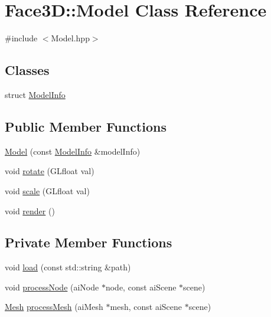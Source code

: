 \hypertarget{class_face3_d_1_1_model}{}\section{Face3D\+:\+:Model Class Reference}
\label{class_face3_d_1_1_model}


{\ttfamily \#include $<$Model.\+hpp$>$}

\subsection*{Classes}
\begin{DoxyCompactItemize}
\item 
struct \hyperlink{struct_face3_d_1_1_model_1_1_model_info}{Model\+Info}
\end{DoxyCompactItemize}
\subsection*{Public Member Functions}
\begin{DoxyCompactItemize}
\item 
\hyperlink{class_face3_d_1_1_model_ae6cd2c6069f0c1f0898ea45356f31250}{Model} (const \hyperlink{struct_face3_d_1_1_model_1_1_model_info}{Model\+Info} \&model\+Info)
\item 
void \hyperlink{class_face3_d_1_1_model_a47fdb34677d2a77da048e614e9100a86}{rotate} (G\+Lfloat val)
\item 
void \hyperlink{class_face3_d_1_1_model_ae4317800ef498c03728e7c82dbe5c3c7}{scale} (G\+Lfloat val)
\item 
void \hyperlink{class_face3_d_1_1_model_a88e8ee28d3babfcb7090f7941663e594}{render} ()
\end{DoxyCompactItemize}
\subsection*{Private Member Functions}
\begin{DoxyCompactItemize}
\item 
void \hyperlink{class_face3_d_1_1_model_a6a5aeb80314d44476b3964c4b977be7d}{load} (const std\+::string \&path)
\item 
void \hyperlink{class_face3_d_1_1_model_a483e8a42f180d07ccbeaa10a56b130e0}{process\+Node} (ai\+Node $\ast$node, const ai\+Scene $\ast$scene)
\item 
\hyperlink{class_face3_d_1_1_mesh}{Mesh} \hyperlink{class_face3_d_1_1_model_aca2d4b10b7468235c5d01c1adc717f87}{process\+Mesh} (ai\+Mesh $\ast$mesh, const ai\+Scene $\ast$scene)
\end{DoxyCompactItemize}
